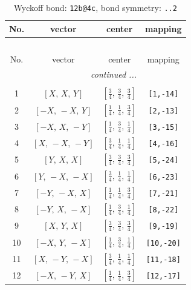 \documentclass[fleqn,8pt]{jsarticle}
\begin{document}
\renewcommand{\arraystretch}{1.2}
\begin{longtable}{cccc}
\caption{Wyckoff bond: {\tt 12b@4c}, bond symmetry: {\tt ..2}}
 \\
 \hline \hline
No. & vector & center & mapping \\ \hline \endfirsthead

\multicolumn{3}{l}{\tablename\ \thetable{}} \\
 \hline \hline
No. & vector & center & mapping \\ \hline \endhead

 \hline \hline
\multicolumn{3}{r}{\footnotesize\it continued ...} \\ \endfoot

 \hline \hline
\multicolumn{3}{r}{} \\ \endlastfoot

1 & $\left[ X,\, X,\, Y \right]$ & $\left[ \frac{3}{4},\, \frac{3}{4},\, \frac{3}{4} \right]$ & {\tt [1,-14]} \\ \hline
2 & $\left[ - X,\, - X,\, Y \right]$ & $\left[ \frac{1}{4},\, \frac{1}{4},\, \frac{3}{4} \right]$ & {\tt [2,-13]} \\ \hline
3 & $\left[ - X,\, X,\, - Y \right]$ & $\left[ \frac{1}{4},\, \frac{3}{4},\, \frac{1}{4} \right]$ & {\tt [3,-15]} \\ \hline
4 & $\left[ X,\, - X,\, - Y \right]$ & $\left[ \frac{3}{4},\, \frac{1}{4},\, \frac{1}{4} \right]$ & {\tt [4,-16]} \\ \hline
5 & $\left[ Y,\, X,\, X \right]$ & $\left[ \frac{3}{4},\, \frac{3}{4},\, \frac{3}{4} \right]$ & {\tt [5,-24]} \\ \hline
6 & $\left[ Y,\, - X,\, - X \right]$ & $\left[ \frac{3}{4},\, \frac{1}{4},\, \frac{1}{4} \right]$ & {\tt [6,-23]} \\ \hline
7 & $\left[ - Y,\, - X,\, X \right]$ & $\left[ \frac{1}{4},\, \frac{1}{4},\, \frac{3}{4} \right]$ & {\tt [7,-21]} \\ \hline
8 & $\left[ - Y,\, X,\, - X \right]$ & $\left[ \frac{1}{4},\, \frac{3}{4},\, \frac{1}{4} \right]$ & {\tt [8,-22]} \\ \hline
9 & $\left[ X,\, Y,\, X \right]$ & $\left[ \frac{3}{4},\, \frac{3}{4},\, \frac{3}{4} \right]$ & {\tt [9,-19]} \\ \hline
10 & $\left[ - X,\, Y,\, - X \right]$ & $\left[ \frac{1}{4},\, \frac{3}{4},\, \frac{1}{4} \right]$ & {\tt [10,-20]} \\ \hline
11 & $\left[ X,\, - Y,\, - X \right]$ & $\left[ \frac{3}{4},\, \frac{1}{4},\, \frac{1}{4} \right]$ & {\tt [11,-18]} \\ \hline
12 & $\left[ - X,\, - Y,\, X \right]$ & $\left[ \frac{1}{4},\, \frac{1}{4},\, \frac{3}{4} \right]$ & {\tt [12,-17]} \\
\end{longtable}
\end{document}
